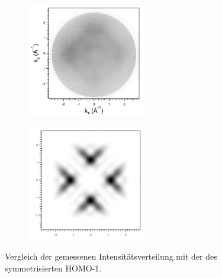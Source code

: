         \begin{figure}
            \centering
            \begin{subfigure}[t]{0.48\textwidth}
                \centering
                \includegraphics[height=5cm]{./content/pictures/FeO+5A/FeO_5A_32_15eV.png}
            \end{subfigure}
            \begin{subfigure}[t]{0.48\textwidth}
                \centering
                \includegraphics[height=5cm]{./content/pictures/FeO+5A/MO_HOMO1_RT_RT.png}
            \end{subfigure}
            \caption{Vergleich der gemessenen Intensitätsverteilung mit der des symmetrisierten HOMO-1.}
            \label{fig:FeO5A3}
        \end{figure}
